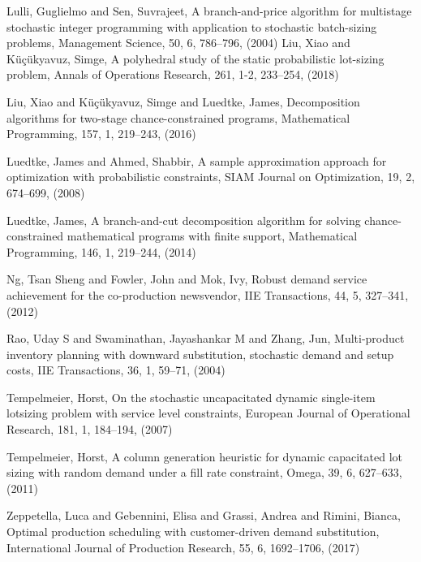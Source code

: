 \documentclass[10pt]{article}
\begin{document}
\begin{thebibliography}{99}
Lulli, Guglielmo and Sen, Suvrajeet, A branch-and-price algorithm for multistage stochastic integer programming with application to stochastic batch-sizing problems, Management Science, 50, 6, 786--796, (2004)
Liu, Xiao and K{\"u}{\c{c}}{\"u}kyavuz, Simge, A polyhedral study of the static probabilistic lot-sizing problem, Annals of Operations Research, 261, 1-2,
233--254, (2018)

Liu, Xiao and K{\"u}{\c{c}}{\"u}kyavuz, Simge and Luedtke, James, 
Decomposition algorithms for two-stage chance-constrained programs, Mathematical Programming, 157,
  1, 219--243, (2016)
 

Luedtke, James and Ahmed, Shabbir, A sample approximation approach for optimization with probabilistic constraints, 
SIAM Journal on Optimization, 19,
2, 674--699, (2008)


  Luedtke, James, A branch-and-cut decomposition algorithm for solving chance-constrained mathematical programs with finite support,
  Mathematical Programming, 146, 1, 219--244,
 (2014)

Ng, Tsan Sheng and Fowler, John and Mok, Ivy, Robust demand service achievement for the co-production newsvendor, IIE Transactions,
  44,
  5,
 327--341,
  (2012)
  
 Rao, Uday S and Swaminathan, Jayashankar M and Zhang, Jun,
 Multi-product inventory planning with downward substitution, stochastic demand and setup costs,
 IIE Transactions, 36, 1, 59--71, (2004)
 
Tempelmeier, Horst, On the stochastic uncapacitated dynamic single-item lotsizing problem with service level constraints, European Journal of Operational Research, 181, 1, 184--194, (2007)
 

Tempelmeier, Horst, A column generation heuristic for dynamic capacitated lot sizing with random demand under a fill rate constraint, Omega, 39, 6, 627--633, (2011)
 

Zeppetella, Luca and Gebennini, Elisa and Grassi, Andrea and Rimini, Bianca, Optimal production scheduling with customer-driven demand substitution, International Journal of Production Research, 55, 6, 1692--1706, (2017)
 



\end{thebibliography}
\end{document}
